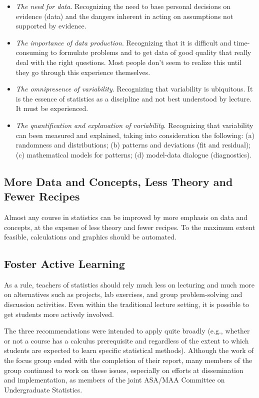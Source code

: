 \documentclass[twoside,openany]{tufte-book}
\begin{document}
\begin{itemize}[leftmargin=1cm, itemsep=.2em]
\item \textit{The need for data}.  Recognizing the need to base personal decisions on evidence (data) and the dangers inherent in acting on assumptions not supported by evidence.
\item \textit{The importance of data production}.  Recognizing that it is difficult and time-consuming to formulate problems and to get data of good quality that really deal with the right questions. Most people don't seem to realize this until they go through this experience themselves.
\item \textit{The omnipresence of variability}.  Recognizing that variability is ubiquitous. It is the essence of statistics as a discipline and not best understood by lecture. It must be experienced.
\item \textit{The quantification and explanation of variability}. Recognizing that variability can been measured and explained, taking into consideration the following: (a) randomness and distributions; (b) patterns and deviations (fit and residual); (c) mathematical models for patterns; (d) model-data dialogue (diagnostics).
\end{itemize}


\subsection{\textbf{More Data and Concepts, Less Theory and Fewer Recipes}}
Almost any course in statistics can be improved by more emphasis on data and concepts, at the expense of less theory and fewer recipes. To the maximum extent feasible, calculations and graphics should be automated.


\subsection{\textbf{Foster Active Learning}}
As a rule, teachers of statistics should rely much less on lecturing and much more on alternatives such as projects, lab exercises, and group problem-solving and discussion activities. Even within the traditional lecture setting, it is possible to get students more actively involved.  

The three recommendations were intended to apply quite broadly (e.g., whether or not a course has a calculus prerequisite and regardless of the extent to which students are expected to learn specific statistical methods).  Although the work of the focus group ended with the completion of their report, many members of the group continued to work on these issues, especially on efforts at dissemination and implementation, as members of the joint ASA/MAA Committee on Undergraduate Statistics.
\end{document}
